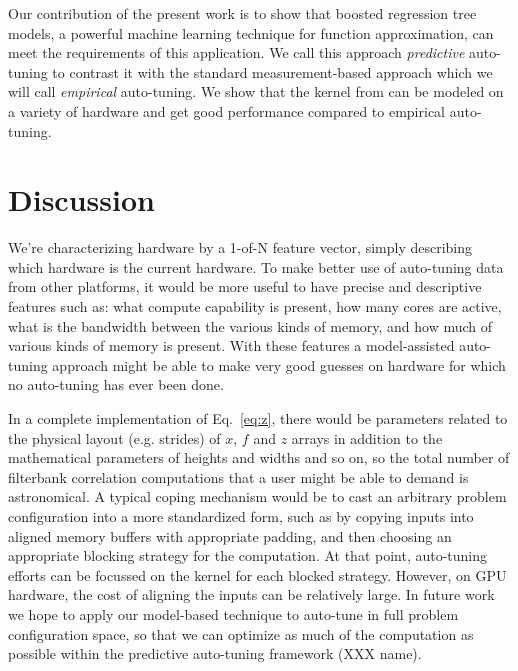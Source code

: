 
Our contribution of the present work is to show that boosted regression tree models,
a powerful machine learning technique for function approximation, can meet the
requirements of this application.
We call this approach {\em predictive} auto-tuning to contrast it with the standard measurement-based approach which we will call {\em empirical} auto-tuning.
We show that the kernel from \citet{pinto+cox:2011gcg} can be modeled on a variety of hardware and get good performance compared to empirical auto-tuning.

\section{Discussion}

We're characterizing hardware by a 1-of-N feature vector, simply describing
which hardware is the current hardware.
To make better use of auto-tuning data from other platforms, it would be more
useful to have precise and descriptive features such as: what compute
capability is present, how many cores are active, what is the bandwidth
between the various kinds of memory, and how much of various kinds of memory
is present.  With these features a model-assisted auto-tuning approach
might be able to make very good guesses on hardware for which no auto-tuning
has ever been done.

In a complete implementation of Eq.~\ref{eq:z}, there would be parameters
related to the physical layout (e.g. strides) of $x$, $f$ and $z$ arrays in
addition to the mathematical parameters of heights and widths and so on,
so the total number of filterbank correlation computations that a user might
be able to demand is astronomical.
A typical coping mechanism would be to cast an arbitrary problem configuration into a more
standardized form, such as by copying inputs into aligned memory buffers with
appropriate padding, and then choosing an appropriate blocking strategy for
the computation. At that point, auto-tuning efforts can be focussed on the
kernel for each blocked strategy. However, on GPU hardware, the cost of
aligning the inputs can be relatively large.  In future work we hope to apply
our model-based technique to auto-tune in full problem configuration space, so
that we can optimize as much of the computation as possible within the
predictive auto-tuning framework (XXX name).

